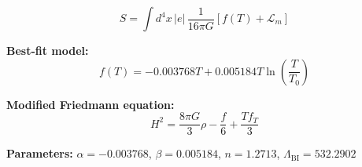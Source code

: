 
\begin{equation}
  S = \int d^4x \, |e| \, \frac{1}{16\pi G} \left[ f(T) + \mathcal{L}_m \right]
\end{equation}

\textbf{Best-fit model:}
\begin{equation}
  f(T) = -0.003768 T + 0.005184 T \ln\!\left(\frac{T}{T_0}\right)
\end{equation}

\textbf{Modified Friedmann equation:}
\begin{equation}
  H^2 = \frac{8\pi G}{3} \rho - \frac{f}{6} + \frac{T f_T}{3}
\end{equation}

\textbf{Parameters:}
$\alpha = -0.003768$, \quad
$\beta = 0.005184$, \quad
$n = 1.2713$, \quad
$\Lambda_{\text{BI}} = 532.2902$